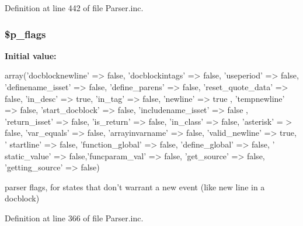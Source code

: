 \-Definition at line 442 of file \-Parser.\-inc.

\hypertarget{class_parser_a0d02e5ea5c251c00bccd6ba6a1b300ea}{
\subsubsection[{\$p\-\_\-flags}]{\setlength{\rightskip}{0pt plus 5cm}\$p\-\_\-flags}}\label{class_parser_a0d02e5ea5c251c00bccd6ba6a1b300ea}
{\bfseries \-Initial value\-:}
\begin{DoxyCode}
 array('docblocknewline' => false, 'docblockintags' => false, 'useperiod' => 
      false,
                        'definename_isset' => false, 'define_parens' => false, 
      'reset_quote_data' => false,
                        'in_desc' => true, 'in_tag' => false, 'newline' => true
      , 'tempnewline' => false,
                        'start_docblock' => false, 'includename_isset' => false
      , 'return_isset' => false,
                        'is_return' => false, 'in_class' => false, 'asterisk' =
      > false, 'var_equals' => false,
                        'arrayinvarname' => false, 'valid_newline' => true, '
      startline' => false,
                        'function_global' => false, 'define_global' => false, '
      static_value' => false,'funcparam_val' => false,
                        'get_source' => false, 'getting_source' => false)
\end{DoxyCode}
parser flags, for states that don't warrant a new event (like new line in a docblock) 

\-Definition at line 366 of file \-Parser.\-inc.


